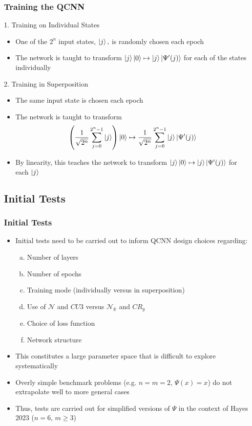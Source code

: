 \documentclass{beamer}
\begin{document}
\begin{frame}
\frametitle{Training the QCNN}
\begin{block}{1. Training on Individual States}
\begin{itemize}
\item One of the $2^n$ input states, $\ket{j},$ is \alert{randomly chosen} each epoch
\item The network is taught to transform $\ket{j}\ket{0} \mapsto \ket{j}\ket{\Psi'(j)} $ for each of the states individually
\end{itemize} 
\end{block}
\begin{block}{2. Training in Superposition}
\begin{itemize}
\item The \alert{same input state} is chosen each epoch
\item The network is taught to transform 
\begin{equation}
\left(\frac{1}{\sqrt{2^n}} \sum^{2^n-1}_{j=0} \ket{j} \right) \ket{0} \mapsto \frac{1}{\sqrt{2^n}} \sum^{2^n -1}_{j=0} \ket{j}\ket{\Psi'(j)}
\end{equation}
\item By linearity, this teaches the network to transform $\ket{j}\ket{0} \mapsto \ket{j}\ket{\Psi'(j)} $ for each $\ket{j}$
\end{itemize} 
\end{block}
\end{frame}

\begin{frame}
\section{Initial Tests}
\frametitle{Initial Tests}
\begin{itemize}
\item Initial tests need to be carried out to \alert{inform QCNN design choices} regarding:
\begin{enumerate}[(a)]
\item Number of layers
\item Number of epochs 
\item Training mode (individually versus in superposition)
\item Use of $\mathcal{N}$ and $CU3$ versus $\mathcal{N}_\mathbb{R}$ and $CR_y$ 
\item Choice of loss function
\item Network structure
\end{enumerate}
\item This constitutes a \alert{large parameter space} that is difficult to explore systematically
\item Overly simple benchmark problems (e.g.
$n=m=2$, $\Psi(x)=x$) do not extrapolate well to more general cases 
\item Thus, tests are carried out for simplified versions of $\Psi$ in the context of Hayes 2023 ($n=6$, $m \geq 3$)
\end{itemize}
\end{frame}
\end{document}
